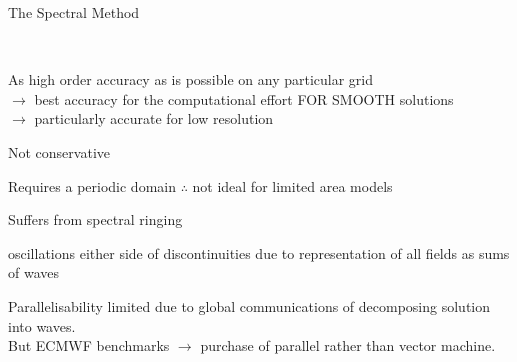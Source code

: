 \begin{slide}{The Spectral Method}

\ \\
\begin{list0}

\item As high order accuracy as is possible on any particular grid\\
$\rightarrow$ best accuracy for the computational effort FOR SMOOTH solutions\\
$\rightarrow$ particularly accurate for low resolution

\item Not conservative

\item Requires a periodic domain $\therefore$ not ideal for limited area models

\item Suffers from spectral ringing
\begin{list1}
    \item oscillations either side of discontinuities due to representation of all fields as sums of waves
\end{list1}
\item Parallelisability limited due to global communications of decomposing solution into waves.\\
But ECMWF benchmarks $\rightarrow$ purchase of parallel rather than vector machine.
\end{list0}

\end{slide}

